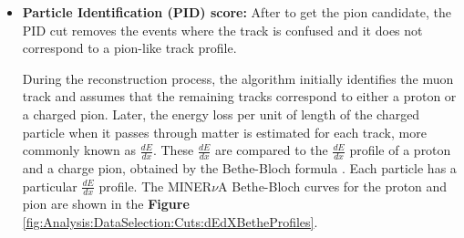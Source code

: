 \begin{itemize}
    
    \item \textbf{Particle Identification (PID) score:} After to get the pion candidate, the PID cut removes the events where the track is confused and it does not correspond to a pion-like track profile.
    
    During the reconstruction process, the algorithm initially identifies the muon track and assumes that the remaining tracks correspond to either a proton or a charged pion. Later, the energy loss per unit of length of the charged particle when it passes through matter is estimated for each track, more commonly known as $\frac{dE}{dx}$. These $\frac{dE}{dx}$ are compared to the $\frac{dE}{dx}$ profile of a proton and a charge pion, obtained by the Bethe-Bloch formula \cite{DetectionTechniques}. Each particle has a particular $\frac{dE}{dx}$ profile. The MINER$\nu$A Bethe-Bloch curves for the proton and pion are shown in the \textbf{Figure} \ref{fig:Analysis:DataSelection:Cuts:dEdXBetheProfiles}. 



\end{itemize}
